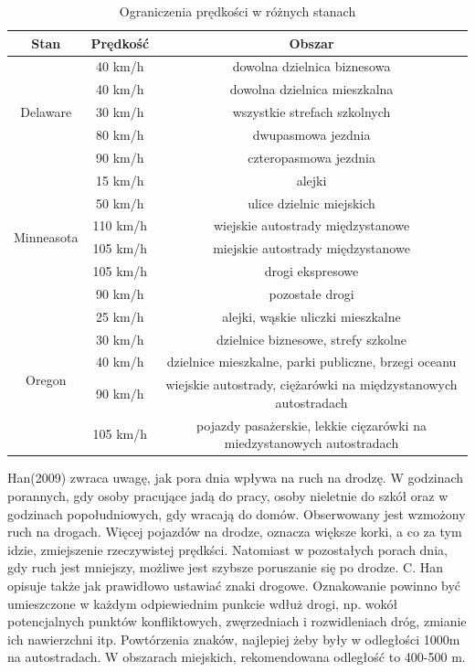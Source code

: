 \begin{table}[ht]
\centering
\caption{Ograniczenia prędkości w różnych stanach}
\label{ograniczeniaStany}
\begin{tabular}{|c|c|c|}
\hline
\textbf{Stan}                    & \textbf{Prędkość} & \textbf{Obszar} \\ \hline
\multirow{5}{*}{Delaware}   & 40 km/h & dowolna dzielnica biznesowa \\ \cline{2-3}
& 40 km/h & dowolna dzielnica mieszkalna \\ \cline{2-3}
& 30 km/h & wszystkie strefach szkolnych \\ \cline{2-3}
& 80 km/h & dwupasmowa jezdnia \\ \cline{2-3}
& 90 km/h & czteropasmowa jezdnia \\ \hline

\multirow{6}{*}{Minneasota}   & 15 km/h & alejki \\ \cline{2-3}
& 50 km/h & ulice dzielnic miejskich \\ \cline{2-3}
& 110 km/h & wiejskie autostrady międzystanowe \\ \cline{2-3}
& 105 km/h & miejskie autostrady międzystanowe \\ \cline{2-3}
& 105 km/h & drogi ekspresowe \\ \cline{2-3}
& 90 km/h & pozostałe drogi \\ \hline

\multirow{5}{*}{Oregon}   & 25 km/h & alejki, wąskie uliczki mieszkalne  \\ \cline{2-3}
& 30 km/h & dzielnice biznesowe, strefy szkolne \\ \cline{2-3}
& 40 km/h & dzielnice mieszkalne, parki publiczne, brzegi oceanu \\ \cline{2-3}
& 90 km/h & wiejskie autostrady, ciężarówki na międzystanowych autostradach \\ \cline{2-3}
& 105 km/h & pojazdy pasażerskie, lekkie cięzarówki na miedzystanowych autostradach\\ \hline
\end{tabular}
\end{table} 


Han(2009) zwraca uwagę, jak pora dnia wpływa na ruch na drodzę. W godzinach porannych, gdy osoby pracujące jadą do pracy, osoby nieletnie do szkół oraz w godzinach popołudniowych, gdy wracają do domów. Obserwowany jest wzmożony ruch na drogach. Więcej pojazdów na drodze, oznacza większe korki, a co za tym idzie, zmiejszenie rzeczywistej prędkści. Natomiast w pozostałych porach dnia, gdy ruch jest mniejszy, możliwe jest szybsze poruszanie się po drodze. C. Han opisuje także jak prawidłowo ustawiać znaki drogowe. Oznakowanie powinno być umieszczone w każdym odpiewiednim punkcie wdłuż drogi, np. wokół potencjalnych punktów konfliktowych, zwęrzedniach i rozwidleniach dróg, zmianie ich nawierzchni itp. Powtórzenia znaków, najlepiej żeby były w odległości 1000m na autostradach. W obszarach miejskich, rekomendowana odległość to 400-500 m.

